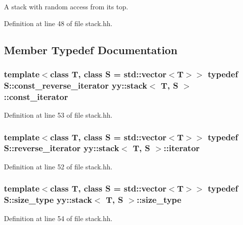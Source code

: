 A stack with random access from its top. 

Definition at line 48 of file stack.\-hh.



\subsection{Member Typedef Documentation}
\hypertarget{classyy_1_1stack_a0cab3a74b0947ce6de68c3520b9229ab}{
\subsubsection[{const\-\_\-iterator}]{\setlength{\rightskip}{0pt plus 5cm}template$<$class T, class S = std\-::vector$<$\-T$>$$>$ typedef S\-::const\-\_\-reverse\-\_\-iterator {\bf yy\-::stack}$<$ T, S $>$\-::{\bf const\-\_\-iterator}}}\label{classyy_1_1stack_a0cab3a74b0947ce6de68c3520b9229ab}


Definition at line 53 of file stack.\-hh.

\hypertarget{classyy_1_1stack_a959921144f243952520a2178121cbe6f}{
\subsubsection[{iterator}]{\setlength{\rightskip}{0pt plus 5cm}template$<$class T, class S = std\-::vector$<$\-T$>$$>$ typedef S\-::reverse\-\_\-iterator {\bf yy\-::stack}$<$ T, S $>$\-::{\bf iterator}}}\label{classyy_1_1stack_a959921144f243952520a2178121cbe6f}


Definition at line 52 of file stack.\-hh.

\hypertarget{classyy_1_1stack_a691214fce87b366b08f7ceb4217d6f27}{
\subsubsection[{size\-\_\-type}]{\setlength{\rightskip}{0pt plus 5cm}template$<$class T, class S = std\-::vector$<$\-T$>$$>$ typedef S\-::size\-\_\-type {\bf yy\-::stack}$<$ T, S $>$\-::{\bf size\-\_\-type}}}\label{classyy_1_1stack_a691214fce87b366b08f7ceb4217d6f27}


Definition at line 54 of file stack.\-hh.



